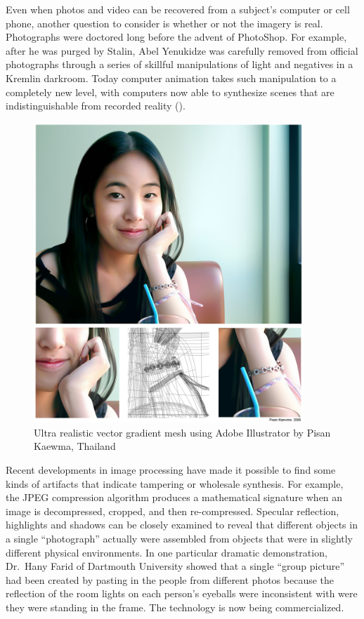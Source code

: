 \documentclass[11pt,letter]{article}
\begin{document}
Even when photos and video can be recovered from a subject's computer
or cell phone, another question to consider is whether or not the
imagery is real. Photographs were doctored long before the advent of
PhotoShop. For example, after he was purged by Stalin, Abel
Yenukidze was carefully removed from official photographs through a
series of skillful manipulations of light and negatives in a Kremlin darkroom\citet{stalins-darkroom}. Today
computer animation takes such manipulation to a completely new level,
with computers now able to synthesize scenes that are 
indistinguishable from recorded reality (). 

\begin{figure}
\includegraphics[width=4in]{art/a1336.jpg}
\caption{Ultra realistic vector gradient mesh using Adobe Illustrator by Pisan Kaewma, Thailand}\label{ultra-realistic}
\end{figure}

Recent developments in image processing have made it
possible to find some kinds of artifacts that indicate tampering or wholesale synthesis. For example,
the JPEG compression algorithm produces a mathematical signature when an
image is decompressed, cropped, and then re-compressed. Specular 
reflection, highlights and shadows can be closely examined to reveal
that different objects in a single ``photograph'' actually were
assembled from objects that were in 
slightly different physical environments. In one particular dramatic
demonstration, Dr.\ Hany Farid of Dartmouth University showed that a single ``group picture''
had been created by pasting in the people from different photos
because the reflection of the room lights on each person's eyeballs
were inconsistent with were they were standing in the frame. The technology is now
being commercialized\citep{farid07}.
\end{document}
